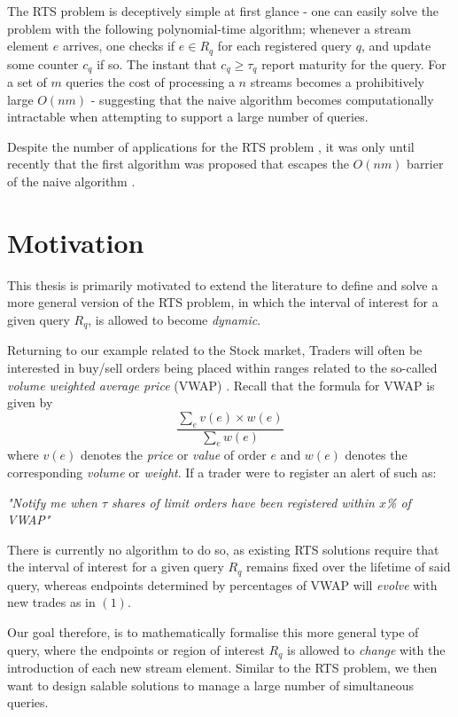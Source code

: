 The RTS problem is deceptively simple at first glance - one can easily solve the problem with the following polynomial-time algorithm; whenever a stream element $e$ arrives, one checks if $e\in R_q$ for each registered query $q$, and update some counter $c_q$ if so. The instant that $c_q \geq \tau_q$ report maturity for the query. For a set of $m$ queries the cost of processing a $n$ streams becomes a prohibitively large $O(nm)$ - suggesting that the naive algorithm becomes computationally intractable when attempting to support a large number of queries. 

Despite the number of applications for the RTS problem \cite{DBLP:conf/sigmod/ZhangGBKCZ22}, it was only until recently that the first algorithm was proposed that escapes the $O(nm)$ barrier of the naive algorithm \cite{GAN16}. 

\section{Motivation}
\label{sec:motivation}
This thesis is primarily motivated to extend the literature to define and solve a more general version of the RTS problem, in which the interval of interest for a given query $R_q$, is allowed to become \textit{dynamic}. 

Returning to our example related to the Stock market, Traders will often be interested in buy/sell orders being placed within ranges related to the so-called \textit{volume weighted average price} (VWAP) \cite{vwap}. Recall that the formula for VWAP is given by 
\begin{equation}
    \frac{\sum_{e}v(e) \times w(e)}{\sum_{e}w(e)}
\end{equation}
where $v(e)$ denotes the \textit{price} or \textit{value} of order $e$ and $w(e)$ denotes the corresponding \textit{volume} or \textit{weight}. If a trader were to register an alert of such as:

\textit{"Notify me when $\tau$ shares of limit orders have been registered within $x$\% of VWAP"}

There is currently no algorithm to do so, as existing RTS solutions require that the interval of interest for a given query $R_q$ remains fixed over the lifetime of said query, whereas endpoints determined by percentages of VWAP will \textit{evolve} with new trades as in $(1)$. 

Our goal therefore, is to mathematically formalise this more general type of query, where the endpoints or region of interest $R_q$ is allowed to \textit{change} with the introduction of each new stream element. Similar to the RTS problem, we then want to design salable solutions to manage a large number of simultaneous queries. 

